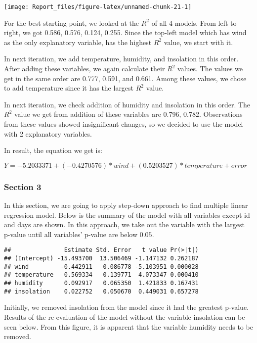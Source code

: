 \documentclass[]{article}
\begin{document}
\begin{center}\texttt{[image: Report\_files/figure-latex/unnamed-chunk-21-1]} \end{center}

For the best starting point, we looked at the \(R^2\) of all 4 models.
From left to right, we got 0.586, 0.576, 0.124, 0.255. Since the
top-left model which has wind as the only explanatory variable, has the
highest \(R^2\) value, we start with it.

In next iteration, we add temperature, humidity, and insolation in this
order. After adding these variables, we again calculate their \(R^2\)
values. The values we get in the same order are 0.777, 0.591, and 0.661.
Among these values, we chose to add temperature since it has the largest
\(R^2\) value.

In next iteration, we check addition of humidity and insolation in this
order. The \(R^2\) value we get from addition of these variables are
0.796, 0.782. Observations from these values showed insignificant
changes, so we decided to use the model with 2 explanatory variables.

In result, the equation we get is:

\(Y = -5.2033371 + (-0.4270576) * wind + (0.5203527) * temperature + error\)

\subsubsection{Section 3}\label{section-3-3}

In this section, we are going to apply step-down approach to find
multiple linear regression model. Below is the summary of the model with
all variables except id and days are shown. In this approach, we take
out the variable with the largest p-value until all variables' p-value
are below \(0.05\).

\begin{verbatim}
##               Estimate Std. Error   t value Pr(>|t|)
## (Intercept) -15.493700  13.506469 -1.147132 0.262187
## wind         -0.442911   0.086778 -5.103951 0.000028
## temperature   0.569334   0.139771  4.073347 0.000410
## humidity      0.092917   0.065350  1.421833 0.167431
## insolation    0.022752   0.050670  0.449031 0.657278
\end{verbatim}

Initially, we removed insolation from the model since it had the
greatest p-value. Results of the re-evaluation of the model without the
variable insolation can be seen below. From this figure, it is apparent
that the variable humidity needs to be removed.
\end{document}

